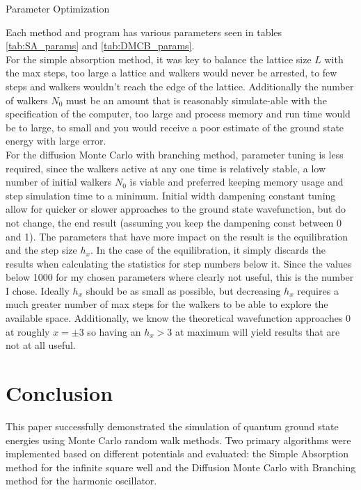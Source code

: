 \documentclass[reqno]{amsart}
\makeatletter
\renewcommand\subsection{\@startsection{subsection}{2}%
  \z@{.5\linespacing\@plus.7\linespacing}{-.5em}%
  {\normalfont\scshape\justify}}
\numberwithin{equation}{section}
\numberwithin{figure}{section}
\makeatother
\begin{document}
\subsection{Parameter Optimization}

Each method and program has various parameters seen in tables \ref{tab:SA_params} and \ref{tab:DMCB_params}. \\

For the simple absorption method, it was key to balance the lattice size $L$ with the max steps, too large a lattice and walkers would never be arrested, to few steps and walkers wouldn't reach the edge of the lattice. Additionally the number of walkers $N_0$ must be an amount that is reasonably simulate-able with the specification of the computer, too large and process memory and run time would be to large, to small and you would receive a poor estimate of the ground state energy with large error. \\

For the diffusion Monte Carlo with branching method, parameter tuning is less required, since the walkers active at any one time is relatively stable, a low number of initial walkers $N_0$ is viable and preferred keeping memory usage and step simulation time to a minimum. Initial width dampening constant tuning allow for quicker or slower approaches to the ground state wavefunction, but do not change, the end result (assuming you keep the dampening const between 0 and 1). The parameters that have more impact on the result is the equilibration and the step size $h_x$. In the case of the equilibration, it simply discards the results when calculating the statistics for step numbers below it. Since the values below 1000 for my chosen parameters where clearly not useful, this is the number I chose. Ideally $h_x$ should be as small as possible, but decreasing $h_x$ requires a much greater number of max steps for the walkers to be able to explore the available space. Additionally, we know the theoretical wavefunction approaches $0$ at roughly $x=\pm 3$ so having an $h_x > 3$ at maximum will yield results that are not at all useful.

\section{Conclusion}

This paper successfully demonstrated the simulation of quantum ground state energies using Monte Carlo random walk methods. Two primary algorithms were implemented based on different potentials and evaluated: the Simple Absorption method for the infinite square well and the Diffusion Monte Carlo with Branching method for the harmonic oscillator. \\
\end{document}
